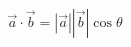\documentclass[preview]{standalone}
\begin{document}
\begin{align*}
\vec{a} \cdot \vec{b} = |\vec{a}| |\vec{b}| \cos{\theta}
\end{align*}
\end{document}
